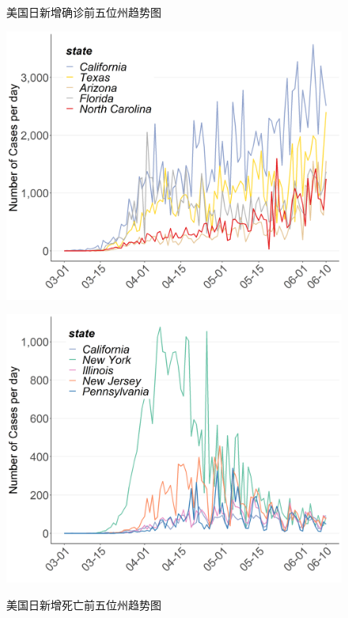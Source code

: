 \documentclass[
]{article}
\begin{document}
\begin{figure}[H]
\centering
\begin{minipage}[b]{0.45\linewidth}
\caption{美国日新增确诊前五位州趋势图}
\includegraphics[]{./input/covid5.png}
\label{}
\end{minipage}
\quad
\begin{minipage}[b]{0.45\linewidth}
\caption{美国日新增死亡前五位州趋势图}
\includegraphics[]{./input/covid6.png}
\label{}
\end{minipage}
\end{figure}
\end{document}
